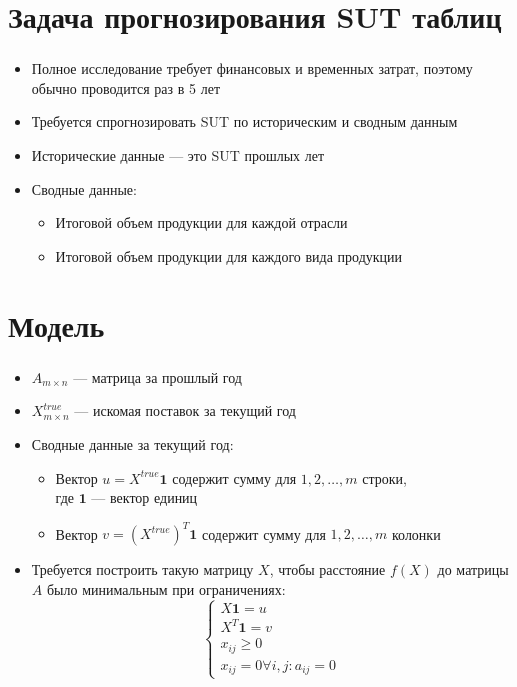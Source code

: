 \documentclass{beamer}
\begin{document}
\section{Задача прогнозирования SUT таблиц}
\begin{frame}
	\frametitle{\insertsection}
	
	\begin{itemize}
	\item Полное исследование требует финансовых и временных затрат, поэтому обычно проводится раз в 5 лет
	\item Требуется спрогнозировать SUT по историческим и сводным данным
	\item Исторические данные — это SUT прошлых лет
	\item Сводные данные: 
	\begin{itemize}
	    \item Итоговой объем продукции для каждой отрасли
	    \item Итоговой объем продукции для каждого вида продукции
	\end{itemize}
	\end{itemize}

\end{frame}

\section{Модель}
\begin{frame}
	\frametitle{\insertsection}
	
	\begin{itemize}
	\item $A_{m\times n}$ — матрица за прошлый год
	\item $X^{true}_{m\times n}$ — искомая поставок за текущий год
	\item Сводные данные за текущий год:
	\begin{itemize}
	\item Вектор $u = X^{true} \mathbf 1$ содержит сумму для $1, 2, \dots, m$ строки, \\ где $\mathbf 1$ — вектор единиц
	\item Вектор $v = (X^{true})^T \mathbf 1$ содержит сумму для $1, 2, \dots, m$ колонки
	\end{itemize}
	\item Требуется построить такую матрицу $X$, чтобы расстояние $f(X)$ до матрицы $A$ было минимальным при ограничениях: 	$$\begin{cases}
	X\mathbf 1 = u \\
	X^T\mathbf 1 = v \\
	x_{ij} \geq 0 \\
	x_{ij} = 0 \forall i,j:a_{ij} = 0
	\end{cases}$$
	\end{itemize}

\end{frame}
\end{document}
